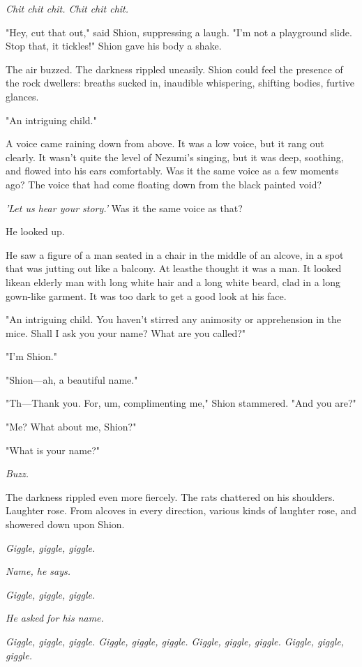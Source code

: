 \emph{Chit chit chit. Chit chit chit.}

"Hey, cut that out," said Shion, suppressing a laugh. "I'm not a
playground slide. Stop that, it tickles!" Shion gave his body a shake.

The air buzzed. The darkness rippled uneasily. Shion could feel the
presence of the rock dwellers: breaths sucked in, inaudible whispering,
shifting bodies, furtive glances.

"An intriguing child."

A voice came raining down from above. It was a low voice, but it rang
out clearly. It wasn't quite the level of Nezumi's singing, but it was
deep, soothing, and flowed into his ears comfortably. Was it the same
voice as a few moments ago? The voice that had come floating down from
the black painted void?

\emph{'Let us hear your story.'} Was it the same voice as that?

He looked up.

He saw a figure of a man seated in a chair in the middle of an alcove,
in a spot that was jutting out like a balcony. At least\el he thought it
was a man. It looked like\el an elderly man with long white hair and a
long white beard, clad in a long gown-like garment. It was too dark to
get a good look at his face.

"An intriguing child. You haven't stirred any animosity or apprehension
in the mice. Shall I ask you your name? What are you called?"

"I'm Shion."

"Shion---ah, a beautiful name."

"Th---Thank you. For, um, complimenting me," Shion stammered. "And you
are?"

"Me? What about me, Shion?"

"What is your name?"

\emph{Buzz.}

The darkness rippled even more fiercely. The rats chattered on his
shoulders. Laughter rose. From alcoves in every direction, various kinds
of laughter rose, and showered down upon Shion.

\emph{Giggle, giggle, giggle.}

\emph{Name, he says.}

\emph{Giggle, giggle, giggle.}

\emph{He asked for his name.}

\emph{Giggle, giggle, giggle. Giggle, giggle, giggle. Giggle, giggle, giggle.
Giggle, giggle, giggle.}


